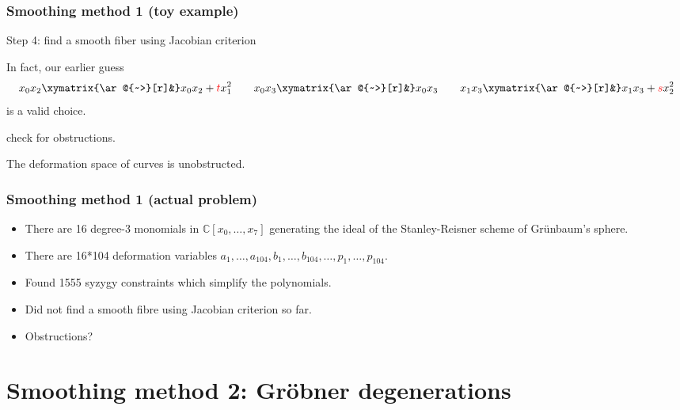 \documentclass{beamer}
\begin{document}
\begin{frame}%
\frametitle{Smoothing method 1 (toy example)}
{\color{blue}Step 4:} find a smooth fiber using Jacobian criterion

In fact, our earlier guess
$$
x_0x_2\xymatrix{\ar@{~>}[r]&}x_0x_2+{\color{red}t}x_1^2\qquad 
x_0x_3\xymatrix{\ar@{~>}[r]&}x_0x_3\qquad 
x_1x_3\xymatrix{\ar@{~>}[r]&}x_1x_3+{\color{red}s}x_2^2
$$
is a valid choice.

 check for obstructions.

The deformation space of curves is unobstructed.
\end{frame}


\begin{frame}%
\frametitle{Smoothing method 1 (actual problem)}

\begin{itemize}
\item There are 
16 degree-3 
monomials in $\mathbb{C}[x_0,…,x_7]$ generating the ideal of
the Stanley-Reisner scheme of Grünbaum's sphere.

\item There are 16*104 deformation variables 
$a_1,…,a_{104}, b_1,…,b_{104},…,p_1,…,p_{104}$.

\item Found 1555 syzygy constraints which simplify the polynomials.

\item Did not find a smooth fibre using Jacobian criterion so far.

\item Obstructions?
\end{itemize}

\end{frame}

\section{Smoothing method 2: Gröbner degenerations}
\label{section-grobner}
\end{document}
